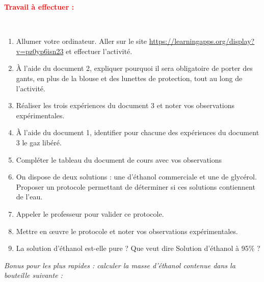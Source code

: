 \begin{Large}
    \textbf{\textcolor{red}{Travail à effectuer :}}
\end{Large}
\\
\begin{enumerate}
    \item Allumer votre ordinateur. Aller sur le site \url{https://learningapps.org/display?v=pz0yp6isn23} et effectuer l'activité.
    \item À l’aide du document 2, expliquer pourquoi il sera obligatoire de porter des gants, en plus de la blouse et des lunettes de protection, tout au long de l’activité.
    \item Réaliser les trois expériences du document 3 et noter vos observations expérimentales.
    \item À l’aide du document 1, identifier pour chacune des expériences du document 3 le gaz libéré.
    \item Compléter le tableau du document de cours avec vos observations
    \item On dispose de deux solutions : une d'éthanol commerciale et une de glycérol. Proposer un protocole permettant de déterminer si ces solutions contiennent de l'eau.
    \item Appeler le professeur pour valider ce protocole.
    \item Mettre en \oe uvre le protocole et noter vos observations expérimentales.
    \item La solution d'éthanol est-elle pure ? Que veut dire \og Solution d'éthanol à 95\% \fg ?
\end{enumerate}

\textit{Bonus pour les plus rapides : calculer la masse d'éthanol contenue dans la bouteille suivante : }

